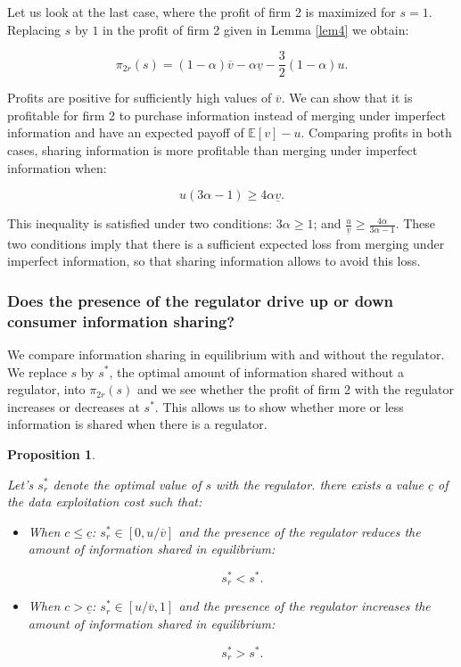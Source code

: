 \documentclass[a4paper,leqno]{article}%
\newtheorem{prop}{Proposition}
\newcommand{\E}{\mathbb E}
\renewcommand{\a}{\alpha}
\newcommand{\uv}{\underline{v}}
\newcommand{\ov}{\overline{v}}
\begin{document}
\medskip

Let us look at the last case, where the profit of firm 2 is maximized for $s=1$. Replacing $s$ by $1$ in the profit of firm 2 given in Lemma \ref{lem4} we obtain:

$$\pi_{2r}(s)=(1-\a)\ov-\a\uv-\frac{3}{2}(1-\a)u.$$

Profits are positive for sufficiently high values of $\ov$. We can show that it is profitable for firm 2 to purchase information instead of merging under imperfect information and have an expected payoff of $\E[v]-u$. Comparing profits in both cases, sharing information is more profitable than merging under imperfect information when:

\begin{equation}\label{eq2}
    u(3\a-1)\geq 4\a\uv.
\end{equation}

This inequality is satisfied under two conditions: $3\a\geq1$; and $\frac{u}{\uv}\geq \frac{4\a}{3\a-1}$. These two conditions imply that there is a sufficient expected loss from merging under imperfect information, so that sharing information allows to avoid this loss.

\medskip

\subsubsection{Does the presence of the regulator drive up or down consumer information sharing?}

We compare information sharing in equilibrium with and without the regulator. We replace $s$ by $s^*$, the optimal amount of information shared without a regulator, into $\pi_{2r}(s)$ and we see whether the profit of firm 2 with the regulator increases or decreases  at $s^*$. This allows us to show whether more or less information is shared when there is a regulator. 

\begin{prop}~~\label{prop:2}

Let's $s_r^*$ denote the optimal value of $s$ with the regulator. there exists a value $\underline{c}$ of the data exploitation cost such that:

\begin{itemize}
    \item When $c\leq\underline{c}$: $s_r^*\in[0,u/\ov]$ and the presence of the regulator reduces the amount  of information shared in equilibrium:
    
    $$s_r^*<s^*.$$
    \item When $c>\underline{c}$: $s_r^*\in[u/\ov,1]$ and the presence of the regulator increases the amount of information shared in equilibrium:
    
    $$s_r^*>s^*.$$
\end{itemize}

\end{prop}
\end{document}
